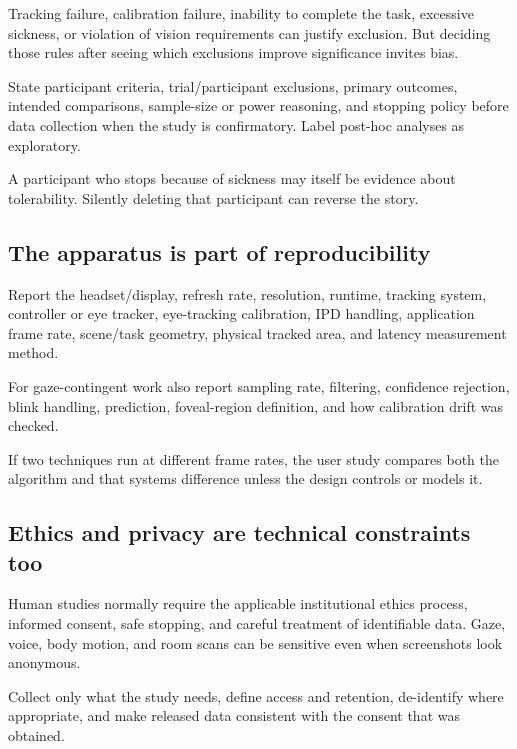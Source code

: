 Tracking failure, calibration failure, inability to complete the task, excessive sickness, or violation of vision requirements can justify exclusion. But deciding those rules after seeing which exclusions improve significance invites bias.

State participant criteria, trial/participant exclusions, primary outcomes, intended comparisons, sample-size or power reasoning, and stopping policy before data collection when the study is confirmatory. Label post-hoc analyses as exploratory.

A participant who stops because of sickness may itself be evidence about tolerability. Silently deleting that participant can reverse the story.

\subsection{The apparatus is part of reproducibility}\label{04-visual-computing-ii-ch035-the-apparatus-is-part-of-reproducibility}

Report the headset/display, refresh rate, resolution, runtime, tracking system, controller or eye tracker, eye-tracking calibration, IPD handling, application frame rate, scene/task geometry, physical tracked area, and latency measurement method.

For gaze-contingent work also report sampling rate, filtering, confidence rejection, blink handling, prediction, foveal-region definition, and how calibration drift was checked.

If two techniques run at different frame rates, the user study compares both the algorithm and that systems difference unless the design controls or models it.

\subsection{Ethics and privacy are technical constraints too}\label{04-visual-computing-ii-ch035-ethics-and-privacy-are-technical-constraints-too}

Human studies normally require the applicable institutional ethics process, informed consent, safe stopping, and careful treatment of identifiable data. Gaze, voice, body motion, and room scans can be sensitive even when screenshots look anonymous.

Collect only what the study needs, define access and retention, de-identify where appropriate, and make released data consistent with the consent that was obtained.

